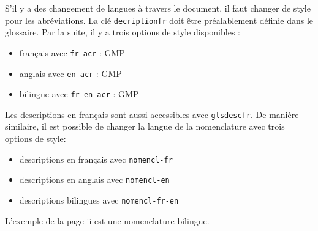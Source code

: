 \documentclass[PhD,nohyperref,english,french]{ulthese}
\begin{document}
S'il y a des changement de langues à travers le document, il faut changer de style pour les abréviations. La clé \texttt{decriptionfr} doit être préalablement définie dans le glossaire. Par la suite, il y a trois options de style disponibles : 
\begin{itemize}
  \item français avec \texttt{fr-acr} : \acrfull{GMP}
 \item anglais avec \texttt{en-acr} : \acrfull{GMP}
 \item bilingue  avec \texttt{fr-en-acr}  : \acrfull{GMP}
\end{itemize}
Les descriptions en français sont aussi accessibles avec \texttt{glsdescfr}. De manière similaire, il est possible de changer la langue de la nomenclature avec trois options de style:
\begin{itemize}
\item descriptions en français avec \texttt{nomencl-fr}
\item descriptions en anglais avec \texttt{nomencl-en}
\item descriptions bilingues avec \texttt{nomencl-fr-en}
\end{itemize}
L'exemple de la page ii est une nomenclature bilingue.
\end{document}
